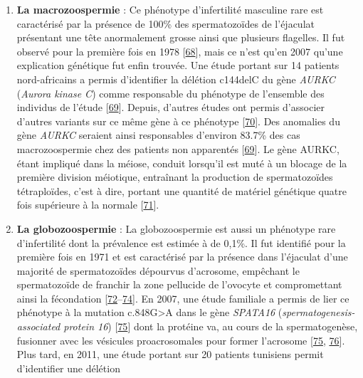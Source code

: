 \documentclass[12pt,a4paper,twoside]{ugathesis}
\providecommand{\tightlist}{%
  \setlength{\itemsep}{0pt}\setlength{\parskip}{0pt}}
\theoremstyle{definition}
\theoremstyle{definition}
\theoremstyle{definition}
\theoremstyle{remark}
\begin{document}
\begin{enumerate}
  \begin{enumerate}
  \def\labelenumii{\alph{enumii}.}
  \tightlist
  \item
    \textbf{La macrozoospermie} : Ce phénotype d'infertilité masculine
    rare est caractérisé par la présence de 100\% des spermatozoïdes de
    l'éjaculat présentant une tête anormalement grosse ainsi que
    plusieurs flagelles. Il fut observé pour la première fois en 1978
    {[}\protect\hyperlink{ref-Nistal}{68}{]}, mais ce n'est qu'en 2007
    qu'une explication génétique fut enfin trouvée. Une étude portant
    sur 14 patients nord-africains a permis d'identifier la délétion
    c144delC du gène \emph{AURKC} (\emph{Aurora kinase C}) comme
    responsable du phénotype de l'ensemble des individus de l'étude
    {[}\protect\hyperlink{ref-Dieterich2007}{69}{]}. Depuis, d'autres
    études ont permis d'associer d'autres variants sur ce même gène à ce
    phénotype {[}\protect\hyperlink{ref-BenKhelifa2011}{70}{]}. Des
    anomalies du gène \emph{AURKC} seraient ainsi responsables d'environ
    83.7\% des cas macrozoospermie chez des patients non apparentés
    {[}\protect\hyperlink{ref-Dieterich2007}{69}{]}. Le gène AURKC,
    étant impliqué dans la méiose, conduit lorsqu'il est muté à un
    blocage de la première division méiotique, entraînant la production
    de spermatozoïdes tétraploïdes, c'est à dire, portant une quantité
    de matériel génétique quatre fois supérieure à la normale
    {[}\protect\hyperlink{ref-Dieterich2009}{71}{]}.\\
  \item
    \textbf{La globozoospermie} : La globozoospermie est aussi un
    phénotype rare d'infertilité dont la prévalence est estimée à de
    0,1\%. Il fut identifié pour la première fois en 1971 et est
    caractérisé par la présence dans l'éjaculat d'une majorité de
    spermatozoïdes dépourvus d'acrosome, empêchant le spermatozoïde de
    franchir la zone pellucide de l'ovocyte et compromettant ainsi la
    fécondation
    {[}\protect\hyperlink{ref-Dam2006}{72}--\protect\hyperlink{ref-Holstein1973}{74}{]}.
    En 2007, une étude familiale a permis de lier ce phénotype à la
    mutation c.848G\textgreater{}A dans le gène \emph{SPATA16}
    (\emph{spermatogenesis-associated protein 16})
    {[}\protect\hyperlink{ref-Dam2007a}{75}{]} dont la protéine va, au
    cours de la spermatogenèse, fusionner avec les vésicules
    proacrosomales pour former l'acrosome
    {[}\protect\hyperlink{ref-Dam2007a}{75},
    \protect\hyperlink{ref-Lu2006}{76}{]}. Plus tard, en 2011, une étude
    portant sur 20 patients tunisiens permit d'identifier une délétion

\end{enumerate}
\end{enumerate}
\end{document}
